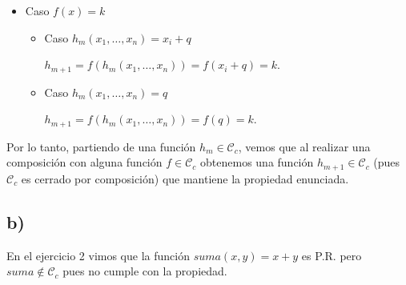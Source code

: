 \begin{itemize}
    \item Caso $f(x) = k$

    \begin{itemize}
        \item Caso $h_m(x_1, \dots, x_n) = x_i + q$

        $h_{m+1} = f(h_m(x_1, \dots, x_n)) = f(x_i + q) = k$.

        \item Caso $h_m(x_1, \dots, x_n) = q$

        $h_{m+1} = f(h_m(x_1, \dots, x_n)) = f(q) = k$.
    \end{itemize}
\end{itemize}

Por lo tanto, partiendo de una función $h_m \in \mathcal{C}_c$, vemos que al realizar una composición con alguna función $f \in \mathcal{C}_c$ obtenemos una función $h_{m+1} \in \mathcal{C}_c$ (pues $\mathcal{C}_c$ es cerrado por composición) que mantiene la propiedad enunciada.

\subsection*{b)}

En el ejercicio 2 vimos que la función $suma(x, y) = x + y$ es P.R. pero $suma \notin \mathcal{C}_c$ pues no cumple con la propiedad.
